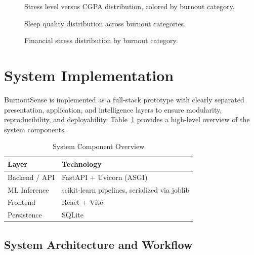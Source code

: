 \documentclass[conference]{IEEEtran}
\begin{document}
\begin{figure}[!t]
\centering
{}
\caption{Stress level versus CGPA distribution, colored by burnout category.}
\label{fig:stress_vs_cgpa}
\end{figure}

\begin{figure}[!t]
\centering
{}
\caption{Sleep quality distribution across burnout categories.}
\label{fig:sleep_quality_vs_burnout}
\end{figure}

\begin{figure}[!t]
\centering
{}
\caption{Financial stress distribution by burnout category.}
\label{fig:financial_stress_vs_burnout}
\end{figure}

\section{System Implementation}

BurnoutSense is implemented as a full-stack prototype with clearly separated presentation, application, and intelligence layers to ensure modularity, reproducibility, and deployability. Table~\ref{tab:system_components} provides a high-level overview of the system components.

\begin{table}[htbp]
\caption{System Component Overview}
\label{tab:system_components}
\centering
\begin{tabular}{@{}ll@{}}
\toprule
\textbf{Layer} & \textbf{Technology} \\
\midrule
Backend / API   & FastAPI + Uvicorn (ASGI) \\
ML Inference    & scikit-learn pipelines, serialized via joblib \\
Frontend        & React + Vite \\
Persistence     & SQLite \\
\bottomrule
\end{tabular}
\end{table}

\subsection{System Architecture and Workflow}
\end{document}
